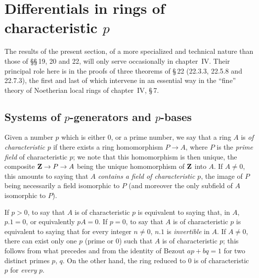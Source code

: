 \section{Differentials in rings of characteristic \texorpdfstring{$p$}{p}}
\label{section:0.21}

The results of the present section, of a more specialized and technical nature than those of \S\S\,19, 20 and 22, will only serve occasionally in chapter~IV.
Their principal role here is in the proofs of three theorems of \S\,22 (22.3.3, 22.5.8 and 22.7.3), the first and last of which intervene in an essential way in the ``fine'' theory of Noetherian local rings of chapter~IV, \S\,7.

\subsection{Systems of \texorpdfstring{$p$}{p}-generators and \texorpdfstring{$p$}{p}-bases}
\label{subsection:0.21.1}

\begin{env}[21.1.1]
\label{0.21.1.1}
Given a number $p$ which is either $0$, or a prime number, we say that a ring $A$ is \emph{of characteristic $p$} if there exists a ring homomorphism $P\to A$, where $P$ is the \emph{prime field} of characteristic $p$; we note that this homomorphism is then unique, the composite $\mathbf{Z}\to P\to A$ being the unique homomorphism of $\mathbf{Z}$ into $A$.
If $A\neq 0$, this amounts to saying that $A$ \emph{contains a field of characteristic $p$}, the image of $P$ being necessarily a field isomorphic to $P$ (and moreover the only subfield of $A$ isomorphic to $P$).
\end{env}

\begin{env}[21.1.2]
\label{0.21.1.2}
If $p>0$, to say that $A$ is of characteristic $p$ is equivalent to saying that, in $A$, $p.1=0$, or equivalently $pA=0$.
If $p=0$, to say that $A$ is of characteristic $p$ is equivalent to saying that for every integer $n\neq 0$, $n.1$ is \emph{invertible} in $A$.
If $A\neq 0$, there can exist only one $p$ (prime or $0$) such that $A$ is of characteristic $p$; this follows from what precedes and from the identity of Bezout $ap+bq=1$ for two distinct primes $p$, $q$.
On the other hand, the ring reduced to $0$ is of characteristic $p$ for \emph{every} $p$.
\end{env}

